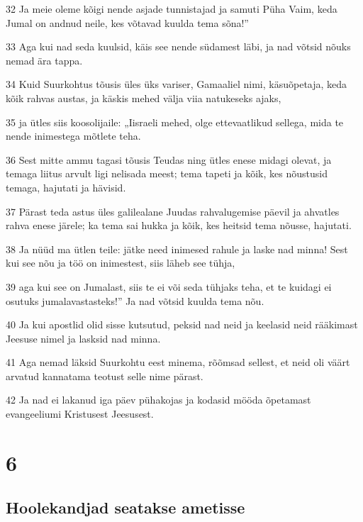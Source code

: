 \par 32 Ja meie oleme kõigi nende asjade tunnistajad ja samuti Püha Vaim, keda Jumal on andnud neile, kes võtavad kuulda tema sõna!”
\par 33 Aga kui nad seda kuulsid, käis see nende südamest läbi, ja nad võtsid nõuks nemad ära tappa.
\par 34 Kuid Suurkohtus tõusis üles üks variser, Gamaaliel nimi, käsuõpetaja, keda kõik rahvas austas, ja käskis mehed välja viia natukeseks ajaks,
\par 35 ja ütles siis koosolijaile: „Iisraeli mehed, olge ettevaatlikud sellega, mida te nende inimestega mõtlete teha.
\par 36 Sest mitte ammu tagasi tõusis Teudas ning ütles enese midagi olevat, ja temaga liitus arvult ligi nelisada meest; tema tapeti ja kõik, kes nõustusid temaga, hajutati ja hävisid.
\par 37 Pärast teda astus üles galilealane Juudas rahvalugemise päevil ja ahvatles rahva enese järele; ka tema sai hukka ja kõik, kes heitsid tema nõusse, hajutati.
\par 38 Ja nüüd ma ütlen teile: jätke need inimesed rahule ja laske nad minna! Sest kui see nõu ja töö on inimestest, siis läheb see tühja,
\par 39 aga kui see on Jumalast, siis te ei või seda tühjaks teha, et te kuidagi ei osutuks jumalavastasteks!” Ja nad võtsid kuulda tema nõu.
\par 40 Ja kui apostlid olid sisse kutsutud, peksid nad neid ja keelasid neid rääkimast Jeesuse nimel ja lasksid nad minna.
\par 41 Aga nemad läksid Suurkohtu eest minema, rõõmsad sellest, et neid oli väärt arvatud kannatama teotust selle nime pärast.
\par 42 Ja nad ei lakanud iga päev pühakojas ja kodasid mööda õpetamast evangeeliumi Kristusest Jeesusest.


\chapter{6}

\section*{Hoolekandjad seatakse ametisse}

